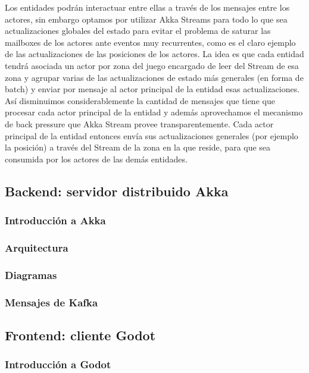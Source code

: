 Los entidades podrán interactuar entre ellas a través de los mensajes entre los actores, 
sin embargo optamos por utilizar Akka Streams para todo lo que sea actualizaciones globales 
del estado para evitar el problema de saturar las mailboxes de los actores ante eventos muy 
recurrentes, como es el claro ejemplo de las actualizaciones de las posiciones de los actores. 
La idea es que cada entidad tendrá asociada un actor por zona del juego encargado de leer del 
Stream de esa zona y agrupar varias de las actualizaciones de estado más generales (en forma de batch) 
y enviar por mensaje al actor principal de la entidad esas actualizaciones. 
Así disminuimos considerablemente la cantidad de mensajes que tiene que procesar cada actor 
principal de la entidad y además aprovechamos el mecanismo de back pressure que Akka Stream 
provee transparentemente. Cada actor principal de la entidad entonces envía sus actualizaciones 
generales (por ejemplo la posición) a través del Stream de la zona en la que reside, para que 
sea consumida por los actores de las demás entidades.



\subsection{Backend: servidor distribuido Akka}

\subsubsection{Introducción a Akka}

\subsubsection{Arquitectura}

\subsubsection{Diagramas}

\subsubsection{Mensajes de Kafka}


\subsection{Frontend: cliente Godot}

\subsubsection{Introducción a Godot}

